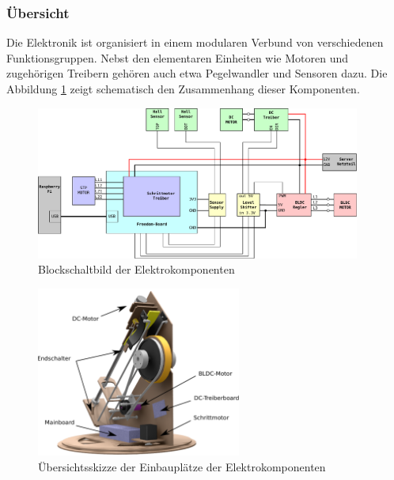\subsubsection{Übersicht}
Die Elektronik ist organisiert in einem modularen Verbund von verschiedenen
Funktionsgruppen. Nebst den elementaren Einheiten wie Motoren und zugehörigen
Treibern gehören auch etwa Pegelwandler und Sensoren dazu. Die Abbildung
\ref{fig:et-block} zeigt schematisch den Zusammenhang dieser Komponenten.


\begin{figure}[h!]
	\centering
	\includegraphics[width=0.95\textwidth]{../../fig/blockdiagram.pdf}
	\caption{Blockschaltbild der Elektrokomponenten}
	\label{fig:et-block}
\end{figure}

\begin{figure}[h!]
	\centering
	\includegraphics[width=0.6\textwidth]{../../fig/et/overview.pdf}
	\caption{Übersichtsskizze der Einbauplätze der Elektrokomponenten}
\end{figure}
